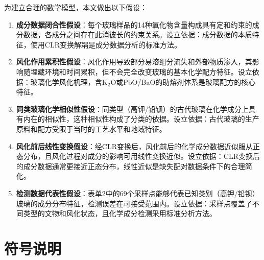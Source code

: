 \documentclass[12pt,a4paper]{ctexart}
\begin{document}
为建立合理的数学模型，本文做出以下假设：

\begin{enumerate}[label=(\arabic*), leftmargin=*]
    \item \textbf{成分数据闭合性假设}：每个玻璃样品的14种氧化物含量构成具有定和约束的成分数据，各成分之间存在此消彼长的约束关系。设立依据：成分数据的本质特征\cite{2}，使用CLR变换解耦是成分数据分析的标准方法。
    \item \textbf{风化作用累积性假设}：风化作用导致部分易溶组分流失和外部物质渗入，其影响随埋藏环境和时间累积，但不会完全改变玻璃的基本化学配方特征。设立依据：玻璃化学风化机理\cite{3}，含K$_2$O或PbO/BaO的助熔剂体系是玻璃配方的核心特征。
    \item \textbf{同类玻璃化学相似性假设}：同类型（高钾/铅钡）的古代玻璃在化学成分上具有内在的相似性，这种相似性构成了分类的依据。设立依据：古代玻璃的生产原料和配方受限于当时的工艺水平和地域特征\cite{1}。
    \item \textbf{风化前后线性变换假设}：经CLR变换后，风化前后的化学成分数据近似服从正态分布，且风化过程对成分的影响可用线性变换近似。设立依据：CLR变换后的成分数据通常更接近正态分布\cite{2}，线性近似是缺失配对数据条件下的合理简化。
    \item \textbf{检测数据代表性假设}：表单2中的69个采样点能够代表已知类别（高钾/铅钡）玻璃的成分分布特征，检测误差在可接受范围内。设立依据：采样点覆盖了不同类型的文物和风化状态，且化学成分检测采用标准分析方法。
\end{enumerate}

\newpage

\section{符号说明}
\end{document}
